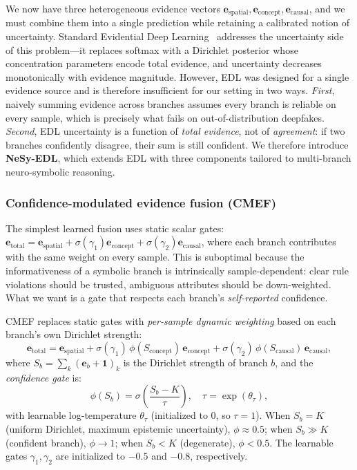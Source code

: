 \documentclass{article}
\begin{document}
We now have three heterogeneous evidence vectors $\bm{e}_\text{spatial}, \bm{e}_\text{concept}, \bm{e}_\text{causal}$, and we must combine them into a single prediction while retaining a calibrated notion of uncertainty. Standard Evidential Deep Learning~\citep{sensoy2018evidential,amini2020deep} addresses the uncertainty side of this problem---it replaces softmax with a Dirichlet posterior whose concentration parameters encode total evidence, and uncertainty decreases monotonically with evidence magnitude. However, EDL was designed for a single evidence source and is therefore insufficient for our setting in two ways. \emph{First}, naively summing evidence across branches assumes every branch is reliable on every sample, which is precisely what fails on out-of-distribution deepfakes. \emph{Second}, EDL uncertainty is a function of \emph{total evidence}, not of \emph{agreement}: if two branches confidently disagree, their sum is still confident. We therefore introduce \textbf{NeSy-EDL}, which extends EDL with three components tailored to multi-branch neuro-symbolic reasoning.


\subsubsection{Confidence-modulated evidence fusion (CMEF)}
\label{sec:cmef}

The simplest learned fusion uses static scalar gates: $\bm{e}_\text{total} = \bm{e}_\text{spatial} + \sigma(\gamma_1)\bm{e}_\text{concept} + \sigma(\gamma_2)\bm{e}_\text{causal}$, where each branch contributes with the same weight on every sample. This is suboptimal because the informativeness of a symbolic branch is intrinsically sample-dependent: clear rule violations should be trusted, ambiguous attributes should be down-weighted. What we want is a gate that respects each branch's \emph{self-reported} confidence.

CMEF replaces static gates with \emph{per-sample dynamic weighting} based on each branch's own Dirichlet strength:
\begin{equation}
  \bm{e}_\text{total} = \bm{e}_\text{spatial}
    + \sigma(\gamma_1)\,\phi(S_\text{concept})\,\bm{e}_\text{concept}
    + \sigma(\gamma_2)\,\phi(S_\text{causal})\,\bm{e}_\text{causal},
  \label{eq:cmef}
\end{equation}
where $S_b = \sum_k (\bm{e}_b + \bm{1})_k$ is the Dirichlet strength of branch $b$, and the \emph{confidence gate} is:
\begin{equation}
  \phi(S_b) = \sigma\!\left(\frac{S_b - K}{\tau}\right), \quad \tau = \exp(\theta_\tau),
  \label{eq:conf_gate}
\end{equation}
with learnable log-temperature $\theta_\tau$ (initialized to 0, so $\tau{=}1$).
When $S_b = K$ (uniform Dirichlet, maximum epistemic uncertainty), $\phi \approx 0.5$; when $S_b \gg K$ (confident branch), $\phi \to 1$; when $S_b < K$ (degenerate), $\phi < 0.5$.
The learnable gates $\gamma_1, \gamma_2$ are initialized to $-0.5$ and $-0.8$, respectively.
\end{document}
